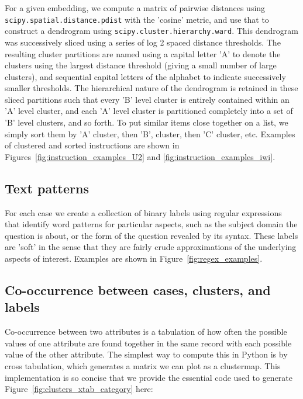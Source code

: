 For a given embedding, we compute a matrix of pairwise distances  using \texttt{scipy.spatial.distance.pdist} with the 'cosine' metric, and use that to construct a dendrogram using \texttt{scipy.cluster.hierarchy.ward}. This dendrogram was successively sliced using a series of log 2 spaced distance thresholds. The resulting cluster partitions are named using a capital letter 'A' to denote the clusters using the largest distance threshold (giving a small number of large clusters), and sequential capital letters of the alphabet to indicate successively smaller thresholds. The hierarchical nature of the dendrogram is retained in these sliced partitions such that every 'B' level cluster is entirely contained within an 'A' level cluster, and each 'A' level cluster is partitioned completely into a set of 'B' level clusters, and so forth. To put similar items close together on a list, we simply sort them by 'A' cluster, then 'B', cluster, then 'C' cluster, etc. Examples of clustered and sorted instructions are shown in Figures~\ref{fig:instruction_examples_U2} and \ref{fig:instruction_examples_iwi}.

\subsection{Text patterns}

For each case we create a collection of binary labels using regular expressions that identify word patterns for particular aspects, such as the subject domain the question is about, or the form of the question revealed by its syntax. These labels are 'soft' in the sense that they are fairly crude approximations of the underlying aspects of interest. Examples are shown in Figure~\ref{fig:regex_examples}.


\subsection{Co-occurrence between cases, clusters, and labels}

Co-occurrence between two attributes is a tabulation of how often the possible values of one attribute are found together in the same record with each possible value of the other attribute. The simplest way to compute this in Python is by cross tabulation, which generates a matrix we can plot as a clustermap. This implementation is so concise that we provide the essential code used to generate Figure~\ref{fig:clusters_xtab_category} here:


